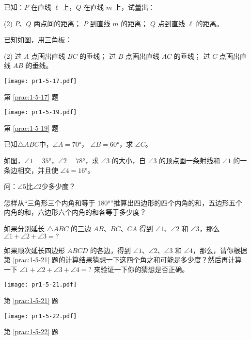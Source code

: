 \begin{Practice}
\begin{question}
	\item\label{prac:1-5-16} 已知：$P$ 在直线 $\ell$ 上，$Q$ 在直线 $m$ 上，试量出：
	\begin{tasks}(2)
		\task $P$、$Q$ 两点间的距离；
		\task $P$ 到直线 $m$ 的距离；
		\task $Q$ 点到直线 $\ell$ 的距离。
	\end{tasks}
	\item\label{prac:1-5-17} 已知如图，用三角板：
	\begin{tasks}(2)
		\task 过 $A$ 点画出直线 $BC$ 的垂线；
		\task 过 $B$ 点画出直线 $AC$ 的垂线；
		\task 过 $C$ 点画出直线 $AB$ 的垂线。
	\end{tasks}
	\begin{figurehere}
		\begin{minipage}[b]{0.48\linewidth}
			\centering
			\texttt{[image: pr1-5-17.pdf]}
			\caption*{第 \ref{prac:1-5-17} 题}
		\end{minipage}
		\begin{minipage}[b]{0.48\linewidth}
			\centering
			\texttt{[image: pr1-5-19.pdf]}
			\caption*{第 \ref{prac:1-5-19} 题}
		\end{minipage}
	\end{figurehere}
	\item 已知$\triangle ABC$中，$\angle A=\ang{70}$， $\angle B=\ang{60}$，求 $\angle C$。
	\item\label{prac:1-5-19} 如图，$\angle 1=\ang{35}$，$\angle 2=\ang{78}$，求 $\angle 3$ 的大小，自 $\angle 3$ 的顶点画一条射线和 $\angle 1$ 的一条边相交，并且使 $\angle 4=\ang{16}$。

	问：$\angle 5$比$\angle 2$少多少度？
	\item 怎样从“三角形三个内角和等于 \ang{180}”推算出四边形的四个内角的和，五边形五个内角的和，六边形六个内角的和各等于多少度？
	\item\label{prac:1-5-21} 如果分别延长 $\triangle ABC$ 的三边 $AB$、$BC$、$CA$ 得到 $\angle 1$、$\angle 2$ 和 $\angle 3$，那么 $\angle 1+\angle 2+\angle 3=?$
	\item\label{prac:1-5-22} 如果顺次延长四边形 $ABCD$ 的各边，得到 $\angle 1$、$\angle 2$、$\angle 3$ 和 $\angle 4$，那么，请你根据第 \ref{prac:1-5-21} 题的计算结果猜想一下这四个角之和可能是多少度？然后再计算一下 $\angle 1+\angle 2+\angle 3+\angle 4=?$ 来验证一下你的猜想是否正确。
	\begin{figurehere}
		\begin{minipage}[b]{0.48\linewidth}
			\centering
			\texttt{[image: pr1-5-21.pdf]}
			\caption*{第 \ref{prac:1-5-21} 题}
		\end{minipage}
		\begin{minipage}[b]{0.48\linewidth}
			\centering
			\texttt{[image: pr1-5-22.pdf]}
			\caption*{第 \ref{prac:1-5-22} 题}
			\end{minipage}
	\end{figurehere}
\end{question}
\end{Practice}

